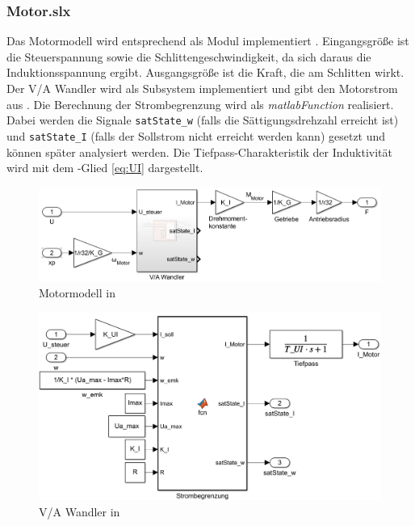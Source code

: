 \subsubsection{Motor.slx}
Das Motormodell wird  entsprechend als Modul implementiert .
Eingangsgröße ist die Steuerspannung sowie die Schlittengeschwindigkeit, da sich daraus die Induktionsspannung ergibt.
Ausgangsgröße ist die Kraft, die am Schlitten wirkt.
Der V/A Wandler wird als Subsystem implementiert und gibt den Motorstrom aus .
Die Berechnung der Strombegrenzung  wird als \emph{matlabFunction} realisiert.
Dabei werden die Signale \texttt{satState\_w} (falls die Sättigungsdrehzahl erreicht ist) und \texttt{satState\_I} (falls der Sollstrom nicht erreicht werden kann) gesetzt und können später analysiert werden.
Die Tiefpass-Charakteristik der Induktivität wird mit dem -Glied \eqref{eq:UI} dargestellt.

\begin{figure}
	\centering
		\includegraphics[scale=0.4]{Bilder/Simulink/motor.PNG}
	\caption{Motormodell in \sm}
	\label{fig:simmot}
\end{figure}

\begin{figure}
	\centering
		\includegraphics[scale=0.5]{Bilder/Simulink/va_wandler.PNG}
	\caption{V/A Wandler in \sm}
	\label{fig:simva}
\end{figure}

